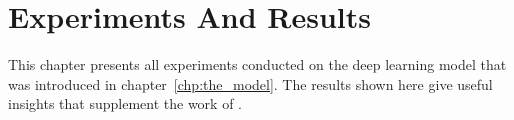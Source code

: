 \chapter{Experiments And Results}\label{chp:experiments-and-results}
	
	This chapter presents all experiments conducted on the deep learning model that was introduced in chapter~\ref{chp:the_model}.
	The results shown here give useful insights that supplement the work of \cite{wang2017deepvo}.
	
